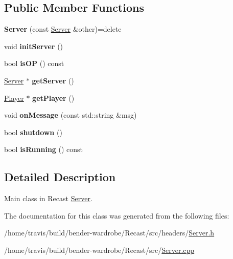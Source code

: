 \subsection*{Public Member Functions}
\begin{DoxyCompactItemize}
\item 
\hypertarget{class_server_aca4a9834f8bf136619d3c4cdb1db4e1e}{{\bfseries Server} (const \hyperlink{class_server}{Server} \&other)=delete}\label{class_server_aca4a9834f8bf136619d3c4cdb1db4e1e}

\item 
\hypertarget{class_server_a7bc5c00fa3ae1ddfae71274ee7d025ea}{void {\bfseries init\-Server} ()}\label{class_server_a7bc5c00fa3ae1ddfae71274ee7d025ea}

\item 
\hypertarget{class_server_a7b6439f1e85af364215c544d675ea972}{bool {\bfseries is\-O\-P} () const }\label{class_server_a7b6439f1e85af364215c544d675ea972}

\item 
\hypertarget{class_server_a8af940772beedcc0b1243adf3f5aec0c}{\hyperlink{class_server}{Server} $\ast$ {\bfseries get\-Server} ()}\label{class_server_a8af940772beedcc0b1243adf3f5aec0c}

\item 
\hypertarget{class_server_a35be365123751e27d6c52ad3962b9b1e}{\hyperlink{class_player}{Player} $\ast$ {\bfseries get\-Player} ()}\label{class_server_a35be365123751e27d6c52ad3962b9b1e}

\item 
\hypertarget{class_server_a37a56fedea3137e9b8080ee0e86e8278}{void {\bfseries on\-Message} (const std\-::string \&msg)}\label{class_server_a37a56fedea3137e9b8080ee0e86e8278}

\item 
\hypertarget{class_server_a58c74bafaaf20b24e9243c7cf5fdfd16}{bool {\bfseries shutdown} ()}\label{class_server_a58c74bafaaf20b24e9243c7cf5fdfd16}

\item 
\hypertarget{class_server_ab8c22a0d6809e9aa84bebce478ba7bc5}{bool {\bfseries is\-Running} () const }\label{class_server_ab8c22a0d6809e9aa84bebce478ba7bc5}

\end{DoxyCompactItemize}


\subsection{Detailed Description}
Main class in Recast \hyperlink{class_server}{Server}. 

The documentation for this class was generated from the following files\-:\begin{DoxyCompactItemize}
\item 
/home/travis/build/bender-\/wardrobe/\-Recast/src/headers/\hyperlink{_server_8h}{Server.\-h}\item 
/home/travis/build/bender-\/wardrobe/\-Recast/src/\hyperlink{_server_8cpp}{Server.\-cpp}\end{DoxyCompactItemize}
